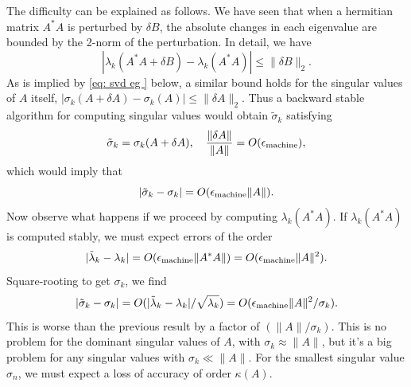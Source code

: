 The difficulty can be explained as follows. We have seen that when a hermitian matrix $ A^*  A $ is perturbed by $ \delta B $, the absolute changes in each eigenvalue  are bounded by the  2-norm of the perturbation. In detail, we have 
\[
    |\lambda _k(A^*  A +\delta B) - \lambda _k(A^* A) | \le \|\delta B\|_2. 
\]
As is implied by \eqref{eq: svd eg } below, a similar bound holds for the singular values of $A$ itself, $ |\sigma _k(A+\delta A) - \sigma _k(A)| \le \|\delta A\|_2 $. Thus a backward stable algorithm for computing singular values would obtain $ \tilde \sigma _k $ satisfying 
\[
    \tilde \sigma _k = \sigma _k(A+ \delta A), \quad \frac{\|\delta A\|}{\|A\|} = O(\epsilon_{\text{machine}}), 
\]
which would imply that 
\[
    |\tilde \sigma _k - \sigma _k|  = O(\epsilon_{\text{machine}} \|A\|). 
\]
Now observe what happens if we proceed by computing $ \lambda _k(A^* A) $. If $ \lambda _k(A^* A) $ is computed stably, we must expect errors of the order 
\[
    |\tilde \lambda _k - \lambda _k| = O(\epsilon_{\text{machine}} \|A^* A\|) = O(\epsilon_{\text{machine}} \|A\|^{2} ). 
\]
Square-rooting to get $ \sigma _k $, we find 
\[
    |\tilde \sigma _k - \sigma _k| = O(|\tilde \lambda _k - \lambda_k| /\sqrt{\lambda _k} ) = O(\epsilon_{\text{machine}} \|A\|^{2}  /\sigma _k). 
\]
This is worse than the previous result by a factor of $ (\|A\|/\sigma _k) $. This is no problem for the dominant singular values of $A$, with $ \sigma _k \approx \|A\| $, but it's a big problem for any singular values with $ \sigma _k \ll \|A\| $. For the smallest singular value $ \sigma _n $, we must expect a loss of accuracy of order $ \kappa(A) $.  

